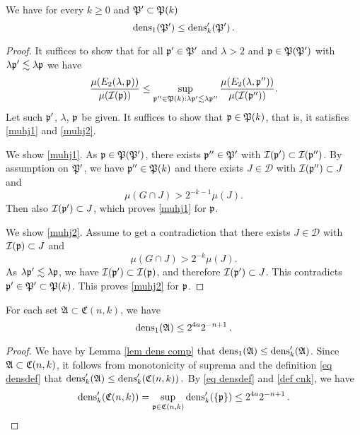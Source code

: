 \begin{lemma}
    \label{lem dens comp}
    We have for every $k\ge 0$ and $\mathfrak P'\subset \mathfrak P(k)$
\begin{equation}
    \operatorname{\operatorname{dens}}_1(\mathfrak P')\le \operatorname{\operatorname{dens}}_k'(\mathfrak P')\, .
\end{equation}
\end{lemma}
\begin{proof}
It suffices to show that for all $\mathfrak p'\in \mathfrak P'$
and  $\lambda>2$ and  $\mathfrak p\in \mathfrak P(\mathfrak P')$ with $\lambda \mathfrak p' \lesssim \lambda \mathfrak p$ we have
\begin{equation}
    \frac{\mu({E}_2(\lambda, \mathfrak p))}{\mu(\mathcal{I}(\mathfrak p))}
    \le \sup_{\mathfrak p'' \in \mathfrak P(k): \lambda \mathfrak p' \lesssim \lambda \mathfrak p''}
    \frac{\mu({E}_2(\lambda, \mathfrak p''))}{\mu(\mathcal{I}(\mathfrak p''))}.
\end{equation}
    Let such $\mathfrak p'$, $\lambda$, $\mathfrak p$ be given.
    It suffices to show that $\mathfrak p\in \mathfrak P(k)$,
    that is, it satisfies \eqref{muhj1}
    and \eqref{muhj2}.

We show \eqref{muhj1}.
 As $\mathfrak p\in \mathfrak P(\mathfrak P')$, there exists
$\mathfrak p''\in \mathfrak P'$ with $\mathcal{I}(\mathfrak p')\subset \mathcal{I}(\mathfrak p'')$. By assumption on $\mathfrak P'$, we have  $\mathfrak p''\in \mathfrak P(k)$ and there exists
$J\in \mathcal{D}$ with
   $\mathcal{I}(\mathfrak p'')\subset J$ and
   \begin{equation}
       \mu(G\cap J)>2^{-k-1} \mu(J).
   \end{equation}
Then also $\mathcal{I}(\mathfrak p')\subset J$, which proves
\eqref{muhj1} for $\mathfrak p$.

We show \eqref{muhj2}. Assume to get a contradiction that
there exists $J\in \mathcal{D}$ with
   $\mathcal{I}(\mathfrak p)\subset J$ and
   \begin{equation}\label{mugj}
       \mu(G\cap J)>2^{-k} \mu(J).
   \end{equation}
   As $\lambda\mathfrak p'\lesssim \lambda\mathfrak p$, we have $\mathcal{I}(\mathfrak p')\subset \mathcal{I}(\mathfrak p)$, and therefore
    $\mathcal{I}(\mathfrak p')\subset J$. This contradicts
   $\mathfrak p'\in \mathfrak P'\subset \mathfrak P(k)$. This proves
\eqref{muhj2} for $\mathfrak p$.
\end{proof}

\begin{lemma}
    \label{lem 1density}
    For each set $\mathfrak{A} \subset \mathfrak{C}(n,k)$, we have
    $$
        \operatorname{\operatorname{dens}}_1(\mathfrak{A}) \le 2^{4a}2^{-n+1}\,.
    $$
\end{lemma}

\begin{proof}
    We have by Lemma \ref{lem dens comp} that
    $\operatorname{\operatorname{dens}}_1(\mathfrak{A}) \le \operatorname{\operatorname{dens}}_k'(\mathfrak{A})$. Since $\mathfrak{A} \subset \mathfrak C(n,k)$, it follows from monotonicity of suprema and the definition \eqref{eq densdef} that
    $
        \operatorname{\operatorname{dens}}_k'(\mathfrak{A}) \le \operatorname{\operatorname{dens}}_k'(\mathfrak C(n,k))\,.
    $
    By \eqref{eq densdef} and \eqref{def cnk}, we have
    $$
        \operatorname{\operatorname{dens}}_k'(\mathfrak C(n,k)) = \sup_{\mathfrak p \in \mathfrak C(n,k)} \operatorname{\operatorname{dens}}_k'(\{\mathfrak p\}) \le 2^{4a}2^{-n+1}\,.
    $$
\end{proof}

